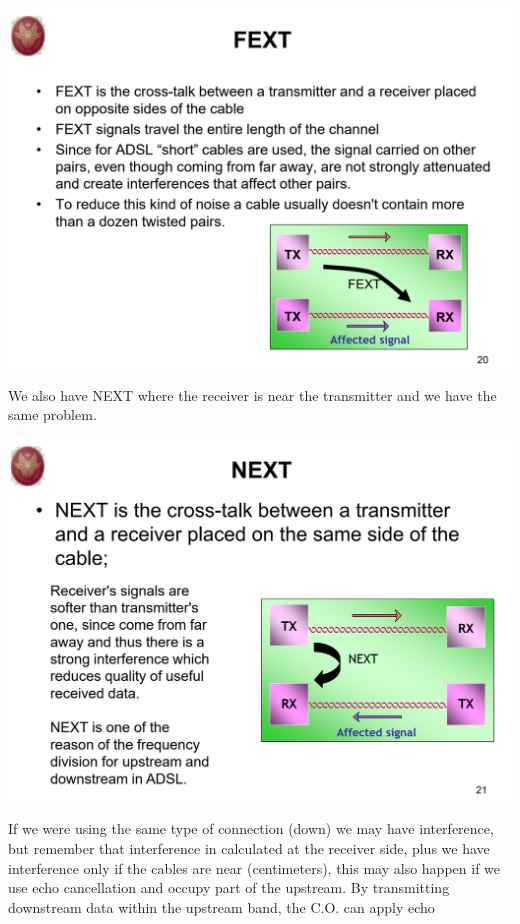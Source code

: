 \documentclass[11pt, a4paper]{article}
\begin{document}
\begin{center}
    \includegraphics[scale=0.5]{img/AccessNetworks/XDSL/FEXT.png}
\end{center}
We also have NEXT where the receiver is near the transmitter and we have the same problem.
\begin{center}
    \includegraphics[scale=0.5]{img/AccessNetworks/XDSL/NEXT.png}
\end{center}
If we were using the same type of connection (down) we may have interference, but remember that interference in calculated at the receiver side, plus we have interference only if the cables are near (centimeters), this may also happen if we use echo cancellation and occupy part of the upstream.
By transmitting downstream data within the upstream band, the C.O. can apply echo
\end{document}

